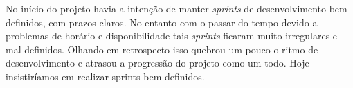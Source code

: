 \par No início do projeto havia a intenção de manter \emph{sprints} de desenvolvimento bem definidos, com prazos claros. No entanto com o passar do tempo devido a problemas de horário e disponibilidade tais \emph{sprints} ficaram muito irregulares e mal definidos. Olhando em retrospecto isso quebrou um pouco o ritmo de desenvolvimento e atrasou a progressão do projeto como um todo. Hoje insistiríamos em realizar sprints bem definidos.